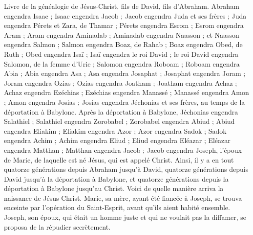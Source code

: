 \begin{multicols}{2}
\VerseOne{}Livre de la généalogie de Jésus-Christ, fils de David, fils d'Abraham.
Abraham engendra Isaac ; Isaac engendra Jacob ; Jacob engendra Juda et ses frères ;
Juda engendra Pérets et Zara, de Thamar ; Pérets engendra Esrom ; Esrom engendra Aram ;
Aram engendra Aminadab ; Aminadab engendra Naasson ; et Naasson engendra Salmon ;
Salmon engendra Boaz, de Rahab ; Boaz engendra Obed, de Ruth ; Obed engendra Isaï ;
Isaï engendra le roi David ; le roi David engendra Salomon, de la femme d'Urie ;
Salomon engendra Roboam ; Roboam engendra Abia ; Abia engendra Asa ;
Asa engendra Josaphat ; Josaphat engendra Joram ; Joram engendra Ozias ;
Ozias engendra Joatham ; Joatham engendra Achaz ; Achaz engendra Ezéchias ;
Ezéchias engendra Manassé ; Manassé engendra Amon ; Amon engendra Josias ;
Josias engendra Jéchonias et ses frères, au temps de la déportation à Babylone.
Après la déportation à Babylone, Jéchonias engendra Salathiel ; Salathiel engendra Zorobabel ;
Zorobabel engendra Abiud ; Abiud engendra Eliakim ; Eliakim engendra Azor ;
Azor engendra Sadok ; Sadok engendra Achim ; Achim engendra Eliud ;
Eliud engendra Eléazar ; Eléazar engendra Matthan ; Matthan engendra Jacob ;
Jacob engendra Joseph, l'époux de Marie, de laquelle est né Jésus, qui est appelé Christ.
Ainsi, il y a en tout quatorze générations depuis Abraham jusqu'à David, quatorze générations depuis David jusqu'à la déportation à Babylone, et quatorze générations depuis la déportation à Babylone jusqu'au Christ.
Voici de quelle manière arriva la naissance de Jésus-Christ. Marie, sa mère, ayant été fiancée à Joseph, se trouva enceinte par l'opération du Saint-Esprit, avant qu'ils aient habité ensemble.
Joseph, son époux, qui était un homme juste et qui ne voulait pas la diffamer, se proposa de la répudier secrètement.

\end{multicols}
